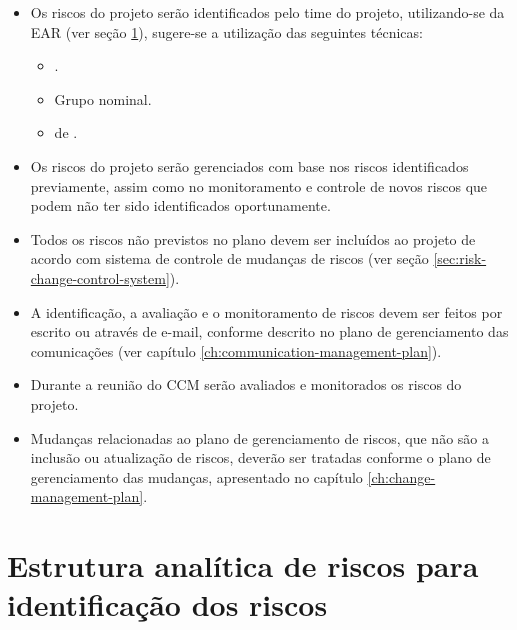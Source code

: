 \begin{itemize}
	\item Os riscos do projeto serão identificados pelo time do projeto, utilizando-se da EAR (ver seção \ref{sec:rbs}), sugere-se a utilização das seguintes técnicas:
	      \begin{itemize}
		      \item {}.
		      \item Grupo nominal.
		      \item {} de .
	      \end{itemize}
	\item Os riscos do projeto serão gerenciados com base nos riscos identificados previamente, assim como no monitoramento e controle de novos riscos que podem não ter sido identificados oportunamente.
	\item Todos os riscos não previstos no plano devem ser incluídos ao projeto de acordo com sistema de controle de mudanças de riscos (ver seção \ref{sec:risk-change-control-system}).
	\item A identificação, a avaliação e o monitoramento de riscos devem ser feitos por escrito ou através de e-mail, conforme descrito no plano de gerenciamento das comunicações (ver capítulo \ref{ch:communication-management-plan}).
	\item Durante a reunião do CCM serão avaliados e monitorados os riscos do projeto.
	\item Mudanças relacionadas ao plano de gerenciamento de riscos, que não são a inclusão ou atualização de riscos,  deverão ser tratadas conforme o plano de gerenciamento das mudanças, apresentado no capítulo \ref{ch:change-management-plan}.
\end{itemize}

\section{Estrutura analítica de riscos para identificação dos riscos}
\label{sec:rbs}

